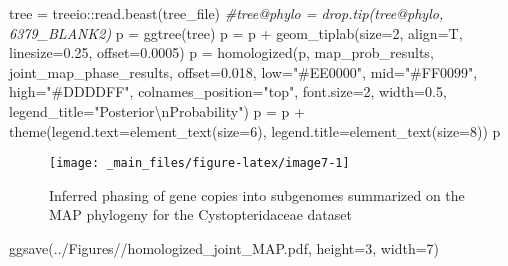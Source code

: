 \documentclass[
]{book}
\newenvironment{Shaded}{\begin{snugshade}}{\end{snugshade}}
\newcommand{\AttributeTok}[1]{\textcolor[rgb]{0.77,0.63,0.00}{#1}}
\newcommand{\CommentTok}[1]{\textcolor[rgb]{0.56,0.35,0.01}{\textit{#1}}}
\newcommand{\DecValTok}[1]{\textcolor[rgb]{0.00,0.00,0.81}{#1}}
\newcommand{\FloatTok}[1]{\textcolor[rgb]{0.00,0.00,0.81}{#1}}
\newcommand{\FunctionTok}[1]{\textcolor[rgb]{0.00,0.00,0.00}{#1}}
\newcommand{\NormalTok}[1]{#1}
\newcommand{\OtherTok}[1]{\textcolor[rgb]{0.56,0.35,0.01}{#1}}
\newcommand{\SpecialCharTok}[1]{\textcolor[rgb]{0.00,0.00,0.00}{#1}}
\newcommand{\StringTok}[1]{\textcolor[rgb]{0.31,0.60,0.02}{#1}}
\begin{document}
\begin{Shaded}
\begin{Highlighting}[]
\NormalTok{tree }\OtherTok{=}\NormalTok{ treeio}\SpecialCharTok{::}\FunctionTok{read.beast}\NormalTok{(tree\_file)}
\CommentTok{\#tree@phylo = drop.tip(tree@phylo, \textquotesingle{}6379\_BLANK2\textquotesingle{})}
\NormalTok{p }\OtherTok{=} \FunctionTok{ggtree}\NormalTok{(tree) }
\NormalTok{p }\OtherTok{=}\NormalTok{ p }\SpecialCharTok{+} \FunctionTok{geom\_tiplab}\NormalTok{(}\AttributeTok{size=}\DecValTok{2}\NormalTok{, }\AttributeTok{align=}\NormalTok{T, }\AttributeTok{linesize=}\FloatTok{0.25}\NormalTok{, }\AttributeTok{offset=}\FloatTok{0.0005}\NormalTok{)  }
\NormalTok{p }\OtherTok{=} \FunctionTok{homologized}\NormalTok{(p, map\_prob\_results, joint\_map\_phase\_results, }
                \AttributeTok{offset=}\FloatTok{0.018}\NormalTok{, }\AttributeTok{low=}\StringTok{"\#EE0000"}\NormalTok{, }\AttributeTok{mid=}\StringTok{"\#FF0099"}\NormalTok{, }\AttributeTok{high=}\StringTok{"\#DDDDFF"}\NormalTok{, }
                \AttributeTok{colnames\_position=}\StringTok{"top"}\NormalTok{, }\AttributeTok{font.size=}\DecValTok{2}\NormalTok{, }\AttributeTok{width=}\FloatTok{0.5}\NormalTok{,}
                \AttributeTok{legend\_title=}\StringTok{"Posterior}\SpecialCharTok{\textbackslash{}n}\StringTok{Probability"}\NormalTok{) }
\NormalTok{p }\OtherTok{=}\NormalTok{ p }\SpecialCharTok{+} \FunctionTok{theme}\NormalTok{(}\AttributeTok{legend.text=}\FunctionTok{element\_text}\NormalTok{(}\AttributeTok{size=}\DecValTok{6}\NormalTok{),}
              \AttributeTok{legend.title=}\FunctionTok{element\_text}\NormalTok{(}\AttributeTok{size=}\DecValTok{8}\NormalTok{))}
\NormalTok{p}
\end{Highlighting}
\end{Shaded}

\begin{figure}

{\centering \texttt{[image: \_main\_files/figure-latex/image7-1]} 

}

\caption{Inferred phasing of gene copies into subgenomes summarized on the MAP phylogeny for the Cystopteridaceae dataset}\label{fig:image7}
\end{figure}

\begin{Shaded}
\begin{Highlighting}[]
\FunctionTok{ggsave}\NormalTok{(}\StringTok{\textquotesingle{}../Figures//homologized\_joint\_MAP.pdf\textquotesingle{}}\NormalTok{, }\AttributeTok{height=}\DecValTok{3}\NormalTok{, }\AttributeTok{width=}\DecValTok{7}\NormalTok{)}
\end{Highlighting}
\end{Shaded}
\end{document}
